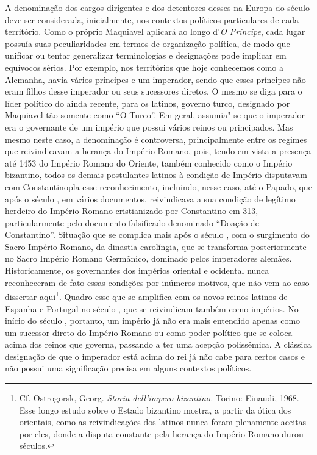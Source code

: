 A denominação dos cargos dirigentes e dos detentores desses na Europa do
século  deve ser considerada, inicialmente, nos contextos políticos
particulares de cada território. Como o próprio Maquiavel aplicará ao
longo d'\emph{O Príncipe}, cada lugar possuía suas peculiaridades
em termos de organização política, de modo que unificar ou tentar
generalizar terminologias e designações pode implicar em equívocos
sérios. Por exemplo, nos territórios que hoje conhecemos como a
Alemanha, havia vários príncipes e um imperador, sendo que esses
príncipes não eram filhos desse imperador ou seus sucessores diretos. O
mesmo se diga para o líder político do ainda recente, para os latinos,
governo turco, designado por Maquiavel tão somente como ``O Turco''. Em
geral, assumia"-se que o imperador era o governante de um império que
possui vários reinos ou principados. Mas mesmo neste caso, a denominação
é controversa, principalmente entre os regimes que reivindicavam a
herança do Império Romano, pois, tendo em vista a presença até 1453 do
Império Romano do Oriente, também conhecido como o Império bizantino,
todos os demais postulantes latinos à condição de Império disputavam com
Constantinopla esse reconhecimento, incluindo, nesse caso, até o Papado,
que após o século , em vários documentos, reivindicava a sua
condição de legítimo herdeiro do Império Romano cristianizado por
Constantino em 313, particularmente pelo documento falsificado
denominado ``Doação de Constantino''. Situação que se complica mais após
o século , com o surgimento do Sacro Império Romano, da dinastia
carolíngia, que se transforma posteriormente no Sacro Império Romano
Germânico, dominado pelos imperadores alemães. Historicamente, os
governantes dos impérios oriental e ocidental nunca reconheceram de fato
essas condições por inúmeros motivos, que não vem ao caso dissertar
aqui\footnote{Cf. Ostrogorsk, Georg. \emph{Storia dell'impero
  bizantino.} Torino: Einaudi, 1968. Esse longo estudo sobre o Estado
  bizantino mostra, a partir da ótica dos orientais, como as
  reivindicações dos latinos nunca foram plenamente aceitas por eles,
  donde a disputa constante pela herança do Império Romano durou
  séculos.}. Quadro esse que se amplifica com os novos reinos latinos de
Espanha e Portugal no século , que se reivindicam também como
impérios. No início do século , portanto, um império já não era mais
entendido apenas como um sucessor direto do Império Romano ou como poder
político que se coloca acima dos reinos que governa, passando a ter uma
acepção polissêmica. A clássica designação de que o imperador está acima
do rei já não cabe para certos casos e não possui uma significação
precisa em alguns contextos políticos.


